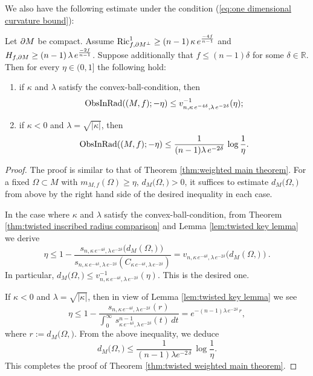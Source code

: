 We also have the following estimate under the condition (\ref{eq:one dimensional curvature bound}):
\begin{thm}\label{thm:twisted weighted main theorem}
Let $\partial M$ be compact.
Assume
$\operatorname{Ric}^{1}_{f,\partial M^{\perp}}\geq (n-1) \,\kappa \,e^{\frac{-4f}{n-1}}$ and $H_{f,\partial M}\geq (n-1)\,\lambda\,e^{\frac{-2f}{n-1}}$.
Suppose additionally that
$f\leq (n-1) \delta$ for some $\delta \in \mathbb{R}$.
Then for every $\eta \in (0,1]$
the following hold:
\begin{enumerate}
\item if $\kappa$ and $\lambda$ satisfy the convex-ball-condition,
         then
         \begin{equation*}
         \operatorname{ObsInRad}((M,f);-\eta) \leq v^{-1}_{n,\kappa\,e^{-4\delta},\lambda\,e^{-2\delta}}(\eta);
         \end{equation*}
\item if $\kappa<0$ and $\lambda=\sqrt{\vert \kappa \vert}$,
         then
         \begin{equation*}
         \operatorname{ObsInRad}((M,f);-\eta) \leq \frac{1}{(n-1)\lambda\,e^{-2\delta}}\,\log \frac{1}{\eta}.
         \end{equation*}
\end{enumerate}
\end{thm}
\begin{proof}
The proof is similar to that of Theorem \ref{thm:weighted main theorem}.
For a fixed $\Omega \subset M$ with $m_{M,f}(\Omega)\geq \eta,\,d_{M}(\Omega,\bm)>0$,
it suffices to estimate $d_{M}(\Omega,\bm)$ from above by the right hand side of the desired inequality in each case.

In the case where
$\kappa$ and $\lambda$ satisfy the convex-ball-condition,
from Theorem \ref{thm:twisted inscribed radius comparison} and Lemma \ref{lem:twisted key lemma}
we derive
\begin{equation*}
\eta \leq 1-\frac{s_{n,\kappa\,e^{-4\delta},\lambda\,e^{-2\delta}}(d_{M}(\Omega,\bm))}{s_{n,\kappa\,e^{-4\delta},\lambda\,e^{-2\delta}}(C_{\kappa\,e^{-4\delta},\lambda\,e^{-2\delta}})}=v_{n,\kappa\,e^{-4\delta},\lambda\,e^{-2\delta}}(d_{M}(\Omega,\bm)).
\end{equation*}
In particular,
$d_{M}(\Omega,\bm) \leq v^{-1}_{n,\kappa\,e^{-4\delta},\lambda\,e^{-2\delta}}(\eta)$.
This is the desired one.

If $\kappa<0$ and $\lambda=\sqrt{\vert \kappa \vert}$,
then in view of Lemma \ref{lem:twisted key lemma} we see
\begin{equation*}
\eta \leq 1-\frac{s_{n,\kappa \,e^{-4\delta},\lambda \,e^{-2\delta}}(r)}{\int^{\infty}_{0}\, s^{n-1}_{\kappa\,e^{-4\delta},\lambda\,e^{-2\delta}}(t)\,dt}=e^{-(n-1)\lambda \,e^{-2\delta} \,r},
\end{equation*}
where $r:=d_{M}(\Omega,\bm)$.
From the above inequality,
we deduce
\begin{equation*}
d_{M}(\Omega,\bm) \leq \frac{1}{(n-1)\lambda e^{-2\,\delta}}\,\log \frac{1}{\eta}.
\end{equation*}
This completes the proof of Theorem \ref{thm:twisted weighted main theorem}.
\end{proof}

